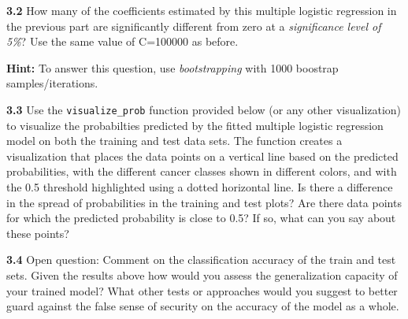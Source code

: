 \documentclass[11pt]{article}
\begin{document}
\textbf{3.2} How many of the coefficients estimated by this multiple
logistic regression in the previous part are significantly different
from zero at a \emph{significance level of 5\%}? Use the same value of
C=100000 as before.

\textbf{Hint:} To answer this question, use \emph{bootstrapping} with
1000 boostrap samples/iterations.

\textbf{3.3} Use the \texttt{visualize\_prob} function provided below
(or any other visualization) to visualize the probabilties predicted by
the fitted multiple logistic regression model on both the training and
test data sets. The function creates a visualization that places the
data points on a vertical line based on the predicted probabilities,
with the different cancer classes shown in different colors, and with
the 0.5 threshold highlighted using a dotted horizontal line. Is there a
difference in the spread of probabilities in the training and test
plots? Are there data points for which the predicted probability is
close to 0.5? If so, what can you say about these points?

\textbf{3.4} Open question: Comment on the classification accuracy of
the train and test sets. Given the results above how would you assess
the generalization capacity of your trained model? What other tests or
approaches would you suggest to better guard against the false sense of
security on the accuracy of the model as a whole.
\end{document}
